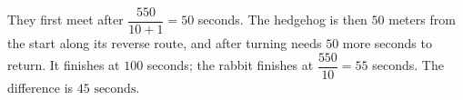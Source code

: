 They first meet after $\dfrac{550}{10+1}=50$ seconds. The hedgehog is then $50$ meters from the start along its reverse route, and after turning needs $50$ more seconds to return. It finishes at $100$ seconds; the rabbit finishes at $\dfrac{550}{10}=55$ seconds. The difference is $\boxed{45\text{ seconds}}$.
